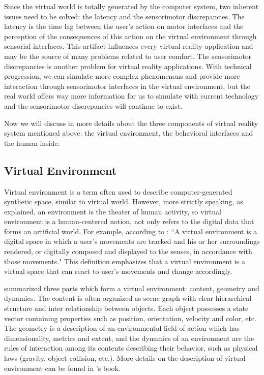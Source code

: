 Since the virtual world is totally generated by the computer system, two inherent issues need to be solved: the latency and the sensorimotor discrepancies. The latency is the time lag between the user's action on motor interfaces and the perception of the consequences of this action on the virtual environment through sensorial interfaces. This artifact influences every virtual reality application and may be the source of many problems related to user comfort. The sensorimotor discrepancies is another problem for virtual reality applications. With technical progression, we can simulate more complex phenomenons and provide more interaction through sensorimotor interfaces in the virtual environment, but the real world offers way more information for us to simulate with current technology and the sensorimotor discrepancies will continue to exist.

Now we will discuss in more details about the three components of virtual reality system mentioned above: the virtual environment, the behavioral interfaces and the human inside.

\subsection{Virtual Environment}
Virtual environment is a term often used to describe computer-generated synthetic space, similar to virtual world. However, more strictly speaking, as \citet{Ellis1991VE} explained, an environment is the theater of human activity, so virtual environment is a human-centered notion, not only refers to the digital data that forms an artificial world. For example, according to \citet{Fox2009Guide}: ``A virtual environment is a digital space in which a user's movements are tracked and his or her surroundings rendered, or digitally composed and displayed to the senses, in accordance with those movements." This definition emphasizes that a virtual environment is a virtual space that can react to user's movements and change accordingly.

\citet{Ellis1991VE} summarized three parts which form a virtual environment: content, geometry and dynamics. The content is often organized as scene graph with clear hierarchical structure and inter relationship between objects. Each object possesses a state vector containing properties such as position, orientation, velocity and color, etc. The geometry is a description of an environmental field of action which has dimensionality, metrics and extent, and the dynamics of an environment are the rules of interaction among its contents describing their behavior, such as physical laws (gravity, object collision, etc.). More details on the description of virtual environment can be found in \citet{Ellis1991Pictorial}'s book.

